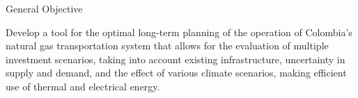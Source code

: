 \documentclass[aspectratio=169,12pt]{beamer}
\begin{document}
\frame{\titlepage}

\begin{frame}{General Objective}
	\begin{block}{}
		\small
		Develop a tool for the optimal long-term planning of the operation of Colombia's natural gas transportation system that allows for the evaluation of multiple investment scenarios, taking into account existing infrastructure, uncertainty in supply and demand, and the effect of various climate scenarios, making efficient use of thermal and electrical energy.
	\end{block}
\end{frame}
	
\end{document}
